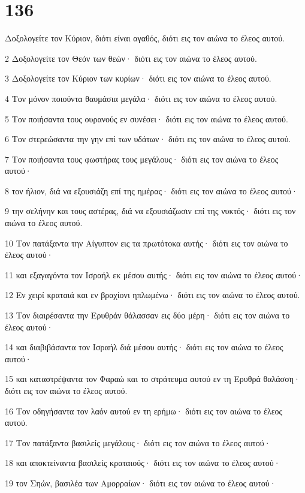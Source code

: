 \chapter{136}

\par Δοξολογείτε τον Κύριον, διότι είναι αγαθός, διότι εις τον αιώνα το έλεος αυτού.
\par 2 Δοξολογείτε τον Θεόν των θεών· διότι εις τον αιώνα το έλεος αυτού.
\par 3 Δοξολογείτε τον Κύριον των κυρίων· διότι εις τον αιώνα το έλεος αυτού.
\par 4 Τον μόνον ποιούντα θαυμάσια μεγάλα· διότι εις τον αιώνα το έλεος αυτού.
\par 5 Τον ποιήσαντα τους ουρανούς εν συνέσει· διότι εις τον αιώνα το έλεος αυτού.
\par 6 Τον στερεώσαντα την γην επί των υδάτων· διότι εις τον αιώνα το έλεος αυτού.
\par 7 Τον ποιήσαντα τους φωστήρας τους μεγάλους· διότι εις τον αιώνα το έλεος αυτού·
\par 8 τον ήλιον, διά να εξουσιάζη επί της ημέρας· διότι εις τον αιώνα το έλεος αυτού·
\par 9 την σελήνην και τους αστέρας, διά να εξουσιάζωσιν επί της νυκτός· διότι εις τον αιώνα το έλεος αυτού.
\par 10 Τον πατάξαντα την Αίγυπτον εις τα πρωτότοκα αυτής· διότι εις τον αιώνα το έλεος αυτού·
\par 11 και εξαγαγόντα τον Ισραήλ εκ μέσου αυτής· διότι εις τον αιώνα το έλεος αυτού·
\par 12 Εν χειρί κραταιά και εν βραχίονι ηπλωμένω· διότι εις τον αιώνα το έλεος αυτού.
\par 13 Τον διαιρέσαντα την Ερυθράν θάλασσαν εις δύο μέρη· διότι εις τον αιώνα το έλεος αυτού·
\par 14 και διαβιβάσαντα τον Ισραήλ διά μέσου αυτής· διότι εις τον αιώνα το έλεος αυτού·
\par 15 και καταστρέψαντα τον Φαραώ και το στράτευμα αυτού εν τη Ερυθρά θαλάσση· διότι εις τον αιώνα το έλεος αυτού.
\par 16 Τον οδηγήσαντα τον λαόν αυτού εν τη ερήμω· διότι εις τον αιώνα το έλεος αυτού.
\par 17 Τον πατάξαντα βασιλείς μεγάλους· διότι εις τον αιώνα το έλεος αυτού·
\par 18 και αποκτείναντα βασιλείς κραταιούς· διότι εις τον αιώνα το έλεος αυτού·
\par 19 τον Σηών, βασιλέα των Αμορραίων· διότι εις τον αιώνα το έλεος αυτού·
